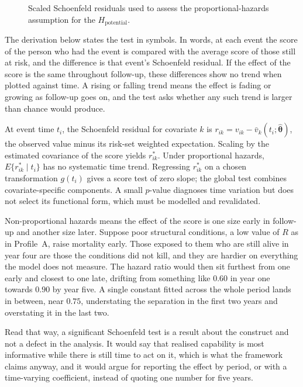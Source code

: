 \begin{figure}[htbp]
\centering
{}
\captionsetup{justification=justified, width=\linewidth}
\caption{Scaled Schoenfeld residuals used to assess the proportional-hazards assumption for the $H_{\text{potential}}$.}
\label{fig:schoenfeld}
\end{figure}

The derivation below states the test in symbols. In words, at each event the score of the person who had the event is compared with the average score of those still at risk, and the difference is that event's Schoenfeld residual. If the effect of the score is the same throughout follow-up, these differences show no trend when plotted against time. A rising or falling trend means the effect is fading or growing as follow-up goes on, and the test asks whether any such trend is larger than chance would produce.

\begin{derivation}
\label{der:schoenfeld}
At event time $t_i$, the Schoenfeld residual for covariate $k$ is
$r_{ik}=v_{ik}-\bar v_k(t_i;\widehat{\boldsymbol\theta})$, the observed value
minus its risk-set weighted expectation. Scaling by the estimated covariance of
the score yields $r^*_{ik}$. Under proportional hazards,
$E\{r^*_{ik}\mid t_i\}$ has no systematic time trend. Regressing $r^*_{ik}$ on a
chosen transformation $g(t_i)$ gives a score test of zero slope; the global test
combines covariate-specific components. A small $p$-value diagnoses time variation
but does not select its functional form, which must be modelled and revalidated.
\end{derivation}

\begin{reading}
Non-proportional hazards means the effect of the score is one size early in follow-up and another size later. Suppose poor structural conditions, a low value of $R$ as in Profile~A, raise mortality early. Those exposed to them who are still alive in year four are those the conditions did not kill, and they are hardier on everything the model does not measure. The hazard ratio would then sit furthest from one early and closest to one late, drifting from something like $0.60$ in year one towards $0.90$ by year five. A single constant fitted across the whole period lands in between, near $0.75$, understating the separation in the first two years and overstating it in the last two.

Read that way, a significant Schoenfeld test is a result about the construct and not a defect in the analysis. It would say that realised capability is most informative while there is still time to act on it, which is what the framework claims anyway, and it would argue for reporting the effect by period, or with a time-varying coefficient, instead of quoting one number for five years.
\end{reading}

